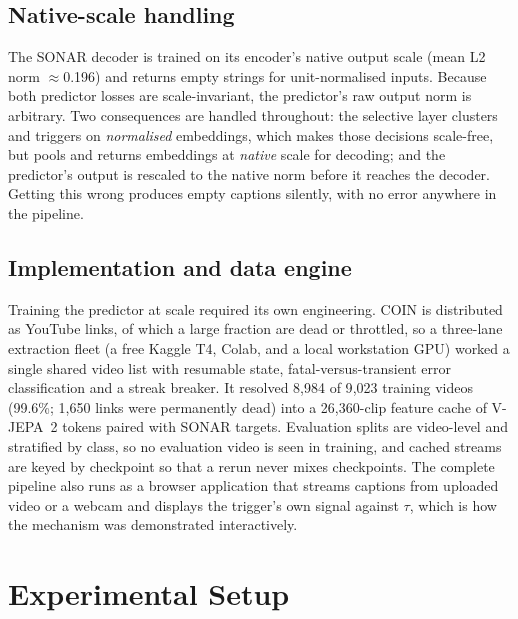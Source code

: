 \documentclass[journal]{IEEEtran}
\begin{document}
\subsection{Native-scale handling}
\label{sec:native}
The SONAR decoder is trained on its encoder's native output scale (mean L2 norm
$\approx$0.196) and returns empty strings for unit-normalised inputs. Because both
predictor losses are scale-invariant, the predictor's raw output norm is
arbitrary. Two consequences are handled throughout: the selective layer clusters
and triggers on \emph{normalised} embeddings, which makes those decisions
scale-free, but pools and returns embeddings at \emph{native} scale for decoding;
and the predictor's output is rescaled to the native norm before it reaches the
decoder. Getting this wrong produces empty captions silently, with no error
anywhere in the pipeline.

\subsection{Implementation and data engine}
Training the predictor at scale required its own engineering. COIN is distributed
as YouTube links, of which a large fraction are dead or throttled, so a three-lane
extraction fleet (a free Kaggle T4, Colab, and a local workstation GPU) worked a
single shared video list with resumable state, fatal-versus-transient error
classification and a streak breaker. It resolved 8{,}984 of 9{,}023 training
videos (99.6\%; 1{,}650 links were permanently dead) into a 26{,}360-clip feature
cache of V-JEPA~2 tokens paired with SONAR targets. Evaluation splits are
video-level and stratified by class, so no evaluation video is seen in training,
and cached streams are keyed by checkpoint so that a rerun never mixes
checkpoints. The complete pipeline also runs as a browser application that streams
captions from uploaded video or a webcam and displays the trigger's own signal
against $\tau$, which is how the mechanism was demonstrated interactively.

\section{Experimental Setup}
\end{document}
